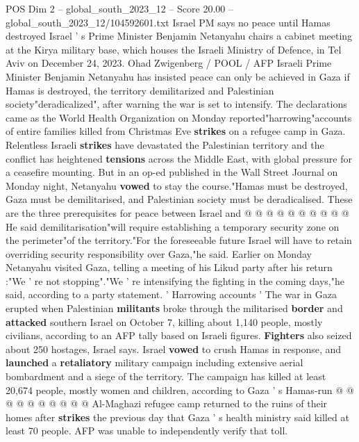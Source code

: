 \begin{textsample}{POS Dim 2 – global\_south\_2023\_12 – Score 20.00 – global\_south\_2023\_12/104592601.txt}  \label{ex:f2_pos_159}
Israel PM says no peace until Hamas destroyed Israel ' s Prime Minister Benjamin Netanyahu chairs a cabinet meeting at the Kirya military base, which houses the Israeli Ministry of Defence, in Tel Aviv on December 24, 2023.
Ohad Zwigenberg / POOL / AFP Israeli Prime Minister Benjamin Netanyahu has insisted peace can only be achieved in Gaza if Hamas is destroyed, the territory demilitarized and Palestinian society"deradicalized", after warning the war is set to intensify.
The declarations came as the World Health Organization on Monday reported"harrowing"accounts of entire families killed from Christmas Eve \textbf{strikes} on a refugee camp in Gaza.
Relentless Israeli \textbf{strikes} have devastated the Palestinian territory and the conflict has heightened \textbf{tensions} across the Middle East, with global pressure for a ceasefire mounting.
But in an op-ed published in the Wall Street Journal on Monday night, Netanyahu \textbf{vowed} to stay the course."Hamas must be destroyed, Gaza must be demilitarised, and Palestinian society must be deradicalised.
These are the three prerequisites for peace between Israel and @ @ @ @ @ @ @ @ @ @ He said demilitarisation"will require establishing a temporary security zone on the perimeter"of the territory."For the foreseeable future Israel will have to retain overriding security responsibility over Gaza,"he said.
Earlier on Monday Netanyahu visited Gaza, telling a meeting of his Likud party after his return :"We ' re not stopping"."We ' re intensifying the fighting in the coming days,"he said, according to a party statement. ' Harrowing accounts ' The war in Gaza erupted when Palestinian \textbf{militants} broke through the militarised \textbf{border} and \textbf{attacked} southern Israel on October 7, killing about 1,140 people, mostly civilians, according to an AFP tally based on Israeli figures. \textbf{Fighters} also seized about 250 hostages, Israel says.
Israel \textbf{vowed} to crush Hamas in response, and \textbf{launched} a \textbf{retaliatory} military campaign including extensive aerial bombardment and a siege of the territory.
The campaign has killed at least 20,674 people, mostly women and children, according to Gaza ' s Hamas-run @ @ @ @ @ @ @ @ @ @ Al-Maghazi refugee camp returned to the ruins of their homes after \textbf{strikes} the previous day that Gaza ' s health ministry said killed at least 70 people.
AFP was unable to independently verify that toll.

\end{textsample}
